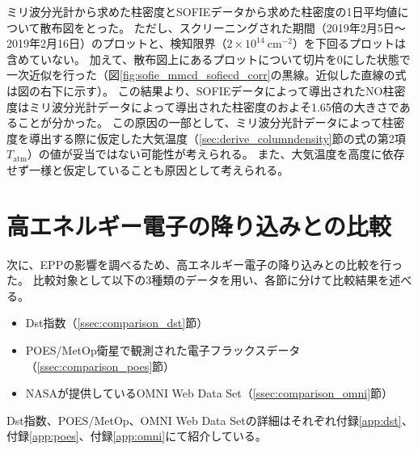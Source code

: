 ミリ波分光計から求めた柱密度とSOFIEデータから求めた柱密度の1日平均値について散布図をとった。
ただし、スクリーニングされた期間（2019年2月5日〜2019年2月16日）のプロットと、検知限界（$2\times 10^{14}\ \mathrm{cm^{-2}}$）を下回るプロットは含めていない。
加えて、散布図上にあるプロットについて切片を0にした状態で一次近似を行った（図\ref{fig:sofie_mmcd_sofiecd_corr}の黒線。近似した直線の式は図の右下に示す）。
この結果より、SOFIEデータによって導出されたNO柱密度はミリ波分光計データによって導出された柱密度のおよそ1.65倍の大きさであることが分かった。
この原因の一部として、ミリ波分光計データによって柱密度を導出する際に仮定した大気温度（\ref{sec:derive_columndensity}節の式の第2項$T_{\mathrm{atm}}$）の値が妥当ではない可能性が考えられる。
また、大気温度を高度に依存せず一様と仮定していることも原因として考えられる。


\section{高エネルギー電子の降り込みとの比較}
\label{sec:comparison_eep}
次に、EPPの影響を調べるため、高エネルギー電子の降り込みとの比較を行った。
比較対象として以下の3種類のデータを用い、各節に分けて比較結果を述べる。
\begin{itemize}
    \item Dst指数（\ref{ssec:comparison_dst}節）
    \item POES/MetOp衛星で観測された電子フラックスデータ（\ref{ssec:comparison_poes}節）
    \item NASAが提供しているOMNI Web Data Set（\ref{ssec:comparison_omni}節）
\end{itemize} \par
Dst指数、POES/MetOp、OMNI Web Data Setの詳細はそれぞれ付録\ref{app:dst}、付録\ref{app:poes}、付録\ref{app:omni}にて紹介している。


